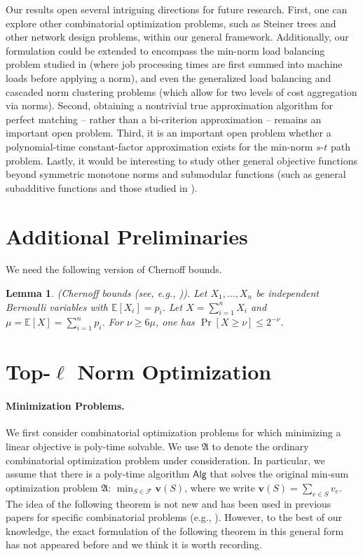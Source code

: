 \documentclass[11pt,a4paper]{article} \usepackage{enumitem}
\newcommand{\calF}{\mathcal{F}}
\newcommand{\boldv}{\boldsymbol{v}}
\newcommand{\myproblem}{\mathfrak{A}}
\newcommand{\Algo}{\mathsf{Alg}}
\newcommand{\topdash}[1]{\mbox{Top-$#1$}}
\newcommand{\E}{\mathbb{E}}
\newtheorem{lemma}[theorem]{Lemma}
\theoremstyle{definition}
\begin{document}
Our results open several intriguing directions for future research. First, one can explore other combinatorial optimization problems, such as Steiner trees and other network design problems, within our general framework. Additionally, our formulation could be extended to encompass the min-norm load balancing problem studied in \cite{chakrabarty2019approximation} (where job processing times are first summed into machine loads before applying a norm), and even the generalized load balancing \cite{deng2022generalized} and cascaded norm clustering problems \cite{chlamtavc2022approximating,abbasi2023parameterized} (which allow for two levels of cost aggregation via norms).
Second, obtaining a nontrivial true approximation algorithm for perfect matching -- rather than a bi-criterion approximation -- remains an important open problem. Third, it is an important open problem whether a polynomial-time constant-factor approximation exists for the min-norm $s$-$t$ path problem. Lastly, it would be interesting to study other general objective functions beyond symmetric monotone norms and submodular functions (such as general subadditive functions \cite{GNS17} and those studied in \cite{li2011generalized}). 

\newpage
\appendix
\section{Additional Preliminaries}
We need the following version of Chernoff bounds.

\begin{lemma}\label{lemma:chernoff}
\emph{(Chernoff bounds (see, e.g., \cite{mitzenmacher2005probability})).}
Let $X_1,\dots,X_n$ be independent Bernoulli variables with $\E[X_i]=p_i$. 
Let $X=\sum_{i=1}^nX_i$ and $\mu=\E[X]=\sum_{i=1}^np_i$. 
For $\nu\geq6\mu$, one has
\(
\Pr[X\geq\nu]\leq 2^{-\nu}
\).
\end{lemma}

\section{\topdash{\ell} Norm Optimization} \label{sec:topl-norm-opt}

\paragraph{Minimization Problems.}
We first consider combinatorial optimization problems for which 
minimizing a linear objective is poly-time solvable.
We use $\myproblem$ to denote the ordinary combinatorial optimization problem
under consideration.
In particular, we assume that there is a poly-time algorithm $\Algo$ 
that solves the original min-sum optimization problem $\myproblem$:
$\min_{S\in \calF} \boldv(S)$, 
where we write $\boldv(S)=\sum_{e\in S}v_e$.
The idea of the following theorem is not new and has been used in previous papers
for specific combinatorial problems 
(e.g., \cite{byrka2018constant,maalouly2022exact}).
However, to the best of our knowledge, the exact formulation of the following theorem 
in this general form
has not appeared before and we think it is worth recording.
\end{document}
